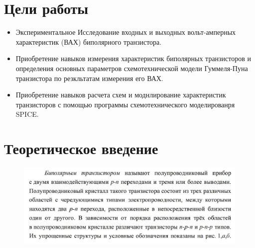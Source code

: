 \documentclass[a4paper,14pt]{article}
\begin{document}

\tableofcontents
\pagebreak
\section{Цели работы}
\begin{itemize}
	\item Экспериментальное Исследование входных и выходных вольт-амперных характеристик (ВАХ) биполярного транзистора.
	
	\item Приобретение навыков измерения характеристик биполярных транзисторов и  определения основных параметров схемотехнической модели Гуммеля-Пуна транзистора по резкльтатам измерения его ВАХ.
	
	\item Приобретение навыков расчета схем и моднлирование характеристик транзисторов с помощью программы схемотехнического моделированря SPICE.
\end{itemize}

\section{Теоретическое введение}

\begin{figure}[H]
	\centering
	\includegraphics[width=\linewidth]{images/theory_1}
	\caption*{}
	\label{fig:theory1}
\end{figure}
\end{document}
